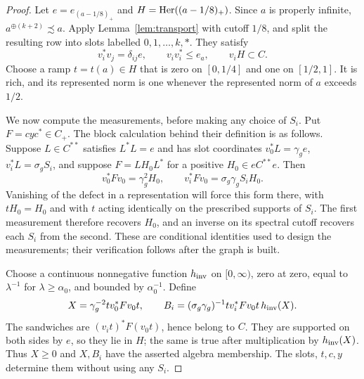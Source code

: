 \begin{proof}
Let \(e=e_{(a-1/8)_+}\) and \(H=\operatorname{Her}((a-1/8)_+)\).
Since \(a\) is properly infinite,
\(a^{\oplus(k+2)}\precsim a\).  Apply
Lemma~\ref{lem:transport} with cutoff \(1/8\), and split the
resulting row into slots labelled \(0,1,\ldots,k,*\).  They
satisfy
\begin{equation}\label{eq:graph-slots}
 v_i^*v_j=\delta_{ij}e,\qquad v_i v_i^*\le e_a,\qquad
 v_iH\subset C.
\end{equation}
Choose a ramp \(t=t(a)\in H\) that is zero on \([0,1/4]\)
and one on \([1/2,1]\).  It is rich, and its represented norm
is one whenever the represented norm of \(a\) exceeds \(1/2\).

We now compute the measurements, before making any choice of
\(S_i\).  Put \(F=cyc^*\in C_+\).  The block calculation behind
their definition is as follows.  Suppose \(L\in C^{**}\) satisfies
\(L^*L=e\) and has slot coordinates
\(v_0^*L=\gamma_g e\), \(v_i^*L=\sigma_g S_i\), and suppose
\(F=LH_0L^*\) for a positive \(H_0\in eC^{**}e\).  Then
\[
 v_0^*Fv_0=\gamma_g^2H_0,\qquad
 v_i^*Fv_0=\sigma_g\gamma_g S_iH_0.
\]
Vanishing of the defect in a representation will force this form
there, with \(tH_0=H_0\) and with \(t\) acting identically on the
prescribed supports of
\(S_i\).  The first measurement therefore recovers \(H_0\), and
an inverse on its spectral cutoff recovers each \(S_i\) from the
second.  These are conditional identities used to design the
measurements; their verification follows after the graph is built.

Choose a continuous nonnegative function \(h_{\rm inv}\) on
\([0,\infty)\), zero
at zero, equal to \(\lambda^{-1}\) for \(\lambda\ge\alpha_0\),
and bounded by \(\alpha_0^{-1}\).  Define
\begin{equation}\label{eq:graph-measurements}
 X=\gamma_g^{-2}t v_0^*Fv_0t,\qquad
 B_i=(\sigma_g\gamma_g)^{-1}
       t v_i^*Fv_0t\,h_{\rm inv}(X).
\end{equation}
The sandwiches are \((v_it)^*F(v_0t)\), hence belong to \(C\).
They are supported on both sides by \(e\), so they lie in \(H\);
the same is true after multiplication by \(h_{\rm inv}(X)\).
Thus \(X\ge0\) and \(X,B_i\) have the asserted algebra
membership.  The slots, \(t,c,y\) determine them without using
any \(S_i\).


\end{proof}
